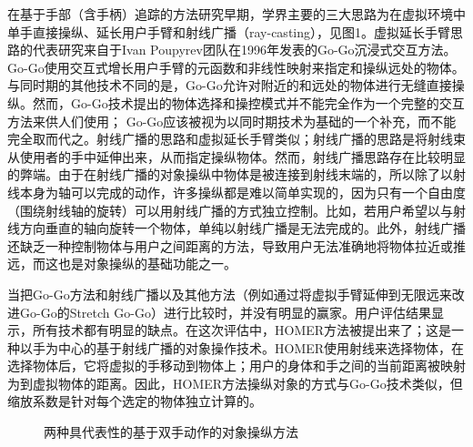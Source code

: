在基于手部（含手柄）追踪的方法研究早期，学界主要的三大思路为在虚拟环境中单手直接操纵、延长用户手臂和射线广播（ray-casting），见图1。虚拟延长手臂思路的代表研究来自于Ivan Poupyrev团队在1996年发表的Go-Go沉浸式交互方法。Go-Go使用交互式增长用户手臂的元函数和非线性映射来指定和操纵远处的物体。与同时期的其他技术不同的是，Go-Go允许对附近的和远处的物体进行无缝直接操纵。然而，Go-Go技术提出的物体选择和操控模式并不能完全作为一个完整的交互方法来供人们使用； Go-Go应该被视为以同时期技术为基础的一个补充，而不能完全取而代之。射线广播的思路和虚拟延长手臂类似；射线广播的思路是将射线束从使用者的手中延伸出来，从而指定操纵物体。然而，射线广播思路存在比较明显的弊端。由于在射线广播的对象操纵中物体是被连接到射线末端的，所以除了以射线本身为轴可以完成的动作，许多操纵都是难以简单实现的，因为只有一个自由度（围绕射线轴的旋转）可以用射线广播的方式独立控制。比如，若用户希望以与射线方向垂直的轴向旋转一个物体，单纯以射线广播是无法完成的。此外，射线广播还缺乏一种控制物体与用户之间距离的方法，导致用户无法准确地将物体拉近或推远，而这也是对象操纵的基础功能之一。

当把Go-Go方法和射线广播以及其他方法（例如通过将虚拟手臂延伸到无限远来改进Go-Go的Stretch Go-Go）进行比较时，并没有明显的赢家。用户评估结果显示，所有技术都有明显的缺点。在这次评估中，HOMER方法被提出来了；这是一种以手为中心的基于射线广播的对象操作技术。HOMER使用射线来选择物体，在选择物体后，它将虚拟的手移动到物体上；用户的身体和手之间的当前距离被映射为到虚拟物体的距离。因此，HOMER方法操纵对象的方式与Go-Go技术类似，但缩放系数是针对每个选定的物体独立计算的。

\begin{figure}[t!]
    \centering
    \caption{两种具代表性的基于双手动作的对象操纵方法}
    \label{fig-2}
\end{figure}

